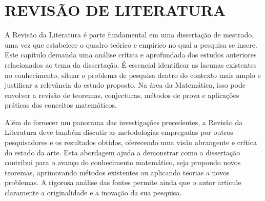 
\chapter{REVISÃO DE LITERATURA}

A Revisão da Literatura é parte fundamental em uma dissertação de mestrado, uma vez que estabelece o quadro teórico e empírico no qual a pesquisa se insere. Este capítulo demanda uma análise crítica e aprofundada dos estudos anteriores relacionados ao tema da dissertação. É essencial identificar as lacunas existentes no conhecimento, situar o problema de pesquisa dentro do contexto mais amplo e justificar a relevância do estudo proposto. Na área da Matemática, isso pode envolver a revisão de teoremas, conjecturas, métodos de prova e aplicações práticas dos conceitos matemáticos.

Além de fornecer um panorama das investigações precedentes, a Revisão da Literatura deve também discutir as metodologias empregadas por outros pesquisadores e os resultados obtidos, oferecendo uma visão abrangente e crítica do estado da arte. Esta abordagem ajuda a demonstrar como a dissertação contribui para o avanço do conhecimento matemático, seja propondo novos teoremas, aprimorando métodos existentes ou aplicando teorias a novos problemas. A rigorosa análise das fontes permite ainda que o autor articule claramente a originalidade e a inovação da sua pesquisa.

